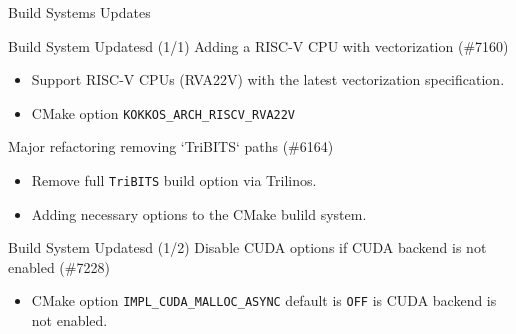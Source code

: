 
\begin{frame}[fragile]

  {\Huge Build Systems Updates}

  \vspace{10pt}

\end{frame}




\begin{frame}[fragile]{Build System Updatesd (1/1)}
Adding a RISC-V CPU with vectorization (\#7160)
  \begin{itemize}
      \item Support RISC-V CPUs (RVA22V) with the latest vectorization specification.
      \item CMake option \texttt{KOKKOS\_ARCH\_RISCV\_RVA22V}
  \end{itemize}
  Major refactoring removing `TriBITS` paths (\#6164)
  \begin{itemize}
      \item Remove full \texttt{TriBITS} build option via Trilinos.
      \item Adding necessary options to the CMake bulild system.
  \end{itemize}

\end{frame}

\begin{frame}[fragile]{Build System Updatesd (1/2)}
Disable CUDA options if CUDA backend is not enabled (\#7228)
  \begin{itemize}
      \item CMake option \texttt{IMPL\_CUDA\_MALLOC\_ASYNC} default is \texttt{OFF} is CUDA backend is not enabled.
  \end{itemize}

\end{frame}



